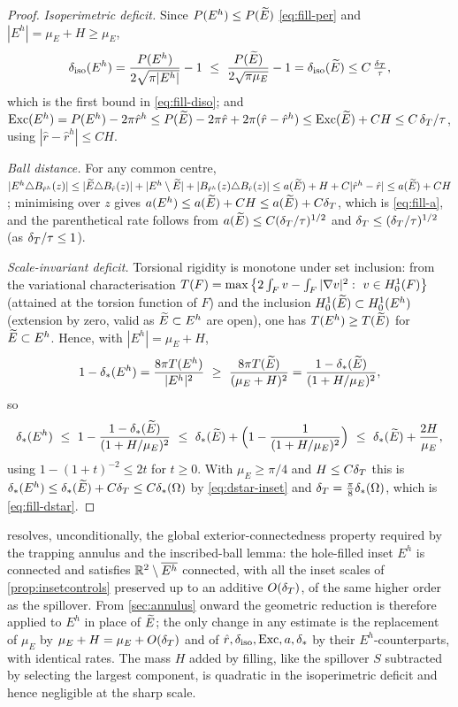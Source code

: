 \begin{proof}
\noindent\emph{Isoperimetric deficit.} Since $P(E^h)\le P(\widetilde{E})$
\eqref{eq:fill-per} and $|E^h|=\mu_E+H\ge\mu_E$,
\[
   \delta_{\mathrm{iso}}(E^h)=\frac{P(E^h)}{2\sqrt{\pi|E^h|}}-1
   \ \le\ \frac{P(\widetilde{E})}{2\sqrt{\pi\mu_E}}-1=\delta_{\mathrm{iso}}(\widetilde{E})\le C\,\tfrac{\delta_T}\tau,
\]
which is the first bound in \eqref{eq:fill-diso}; and $\mathrm{Exc}(E^h)=
P(E^h)-2\pi\hat r^h\le P(\widetilde{E})-2\pi\hat r+2\pi(\hat r-\hat r^h)\le
\mathrm{Exc}(\widetilde{E})+CH\le C\,\delta_T/\tau$, using $|\hat r-\hat r^h|\le CH$.

\noindent\emph{Ball distance.} For any common centre,
$|E^h\triangle B_{\hat r^h}(z)|\le|\widetilde{E}\triangle B_{\hat r}(z)|+|E^h
\setminus\widetilde{E}|+|B_{\hat r^h}(z)\triangle B_{\hat r}(z)|\le a(\widetilde{E})+H+
C|\hat r^h-\hat r|\le a(\widetilde{E})+CH$; minimising over $z$ gives $a(E^h)\le
a(\widetilde{E})+CH\le a(\widetilde{E})+C\delta_T$, which is \eqref{eq:fill-a}, and the parenthetical
rate follows from $a(\widetilde{E})\le C(\delta_T/\tau)^{1/2}$ and $\delta_T\le(\delta_T/\tau)^{1/2}$
(as $\delta_T/\tau\le1$).

\noindent\emph{Scale-invariant deficit.} Torsional rigidity is monotone under
set inclusion: from the variational characterisation
$T(F)=\max\left\{2\int_F v-\int_F|\nabla v|^2:\ v\in H^1_0(F)\right\}$ \textup{(}attained
at the torsion function of $F$\textup{)} and the inclusion $H^1_0(\widetilde{E})\subset
H^1_0(E^h)$ (extension by zero, valid as $\widetilde{E}\subset E^h$ are open), one has
$T(E^h)\ge T(\widetilde{E})$ for $\widetilde{E}\subset E^h$. Hence, with $|E^h|=\mu_E+H$,
\[
   1-\delta_{*}(E^h)=\frac{8\pi T(E^h)}{|E^h|^2}
   \ \ge\ \frac{8\pi T(\widetilde{E})}{(\mu_E+H)^2}
   =\frac{1-\delta_{*}(\widetilde{E})}{(1+H/\mu_E)^2},
\]
so
\[
   \dstar(E^h)\ \le\ 1-\frac{1-\dstar(\Etil)}{(1+H/\mu_E)^2}
   \ \le\ \dstar(\Etil)+\Bigl(1-\frac1{(1+H/\mu_E)^2}\Bigr)
   \ \le\ \dstar(\Etil)+\frac{2H}{\mu_E},
\]
using $1-(1+t)^{-2}\le2t$ for $t\ge0$. With $\mu_E\ge\pi/4$ and $H\le C\delta_T$
this is $\delta_{*}(E^h)\le\delta_{*}(\widetilde{E})+C\delta_T\le C\delta_{*}(\Omega)$ by
\eqref{eq:dstar-inset} and $\delta_T=\tfrac\pi8\delta_{*}(\Omega)$, which is
\eqref{eq:fill-dstar}.
\end{proof}

\begin{remark}\label{rem:fill-use}
 resolves, unconditionally, the global exterior-connectedness
property required by the trapping annulus and the inscribed-ball lemma: the
hole-filled inset $E^h$ is connected and satisfies $\mathbb{R}^2\setminus
\overline{E^h}$ connected, with all the inset scales of
\cref{prop:insetcontrols} preserved up to an additive $O(\delta_T)$, of the same
higher order as the spillover. From \cref{sec:annulus} onward the geometric
reduction is therefore applied to $E^h$ in place of $\widetilde{E}$; the only change
in any estimate is the replacement of $\mu_E$ by $\mu_E+H=\mu_E+O(\delta_T)$ and
of $\hat r,\delta_{\mathrm{iso}},\mathrm{Exc},a,\delta_{*}$ by their $E^h$-counterparts, with identical
rates. The mass $H$ added by filling, like the spillover $S$ subtracted by
selecting the largest component, is quadratic in the isoperimetric deficit
and hence negligible at the sharp scale.
\end{remark}

